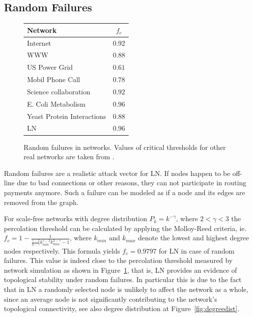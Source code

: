 \documentclass[runningheads]{llncs}
\begin{document}
\subsection{Random Failures}
\begin{figure}
	\begin{tabular}{ | l | c | }
		\hline
		Network & $f_c$  \\ \hline
		Internet & $0.92$  \\ \hline
		WWW & $0.88$ \\ \hline
		US Power Grid & $0.61$  \\ \hline
		Mobil Phone Call & $0.78$ \\ \hline
		Science collaboration& $0.92$ \\ \hline
		E. Coli Metabolism & $0.96$ \\ \hline
		Yeast Protein Interactions & $0.88$ \\ \hline
		LN & $0.96$ \\ \hline
	\end{tabular}
	\caption{Random failures in networks. Values of critical thresholds for other real networks are taken from \cite{barabasi2016network}.}\label{fig:randfailures}
\end{figure}

Random failures are a realistic attack vector for LN. If nodes happen to be off-line due to bad connections or other reasons, they can not participate in routing payments anymore. Such a failure can be modeled as if a node and its edges are removed from the graph.    

For scale-free networks with degree distribution $P_{k}=k^{-\gamma}$, where $2 < \gamma < 3$ the percolation threshold can be calculated by applying the Molloy-Reed criteria, ie. $f_{c}=1-\frac{1}{\frac{\gamma-2}{3-\gamma}k_{min}^{\gamma-2}k_{max}^{3-\gamma}-1}$, where $k_{min}$ and $k_{max}$ denote the lowest and highest degree nodes respectively. This formula yields $f_c=0.9797$ for LN in case of random failures. This value is indeed close to the percolation threshold measured by network simulation as shown in Figure~\ref{fig:randfailures}, that is, LN provides an evidence of topological stability under random failures. In particular this is due to the fact that in LN a randomly selected node is unlikely to affect the network as a whole, since an average node is not significantly contributing to the network's topological connectivity, see also degree distribution at Figure~\ref{fig:degreedist}.
\end{document}
